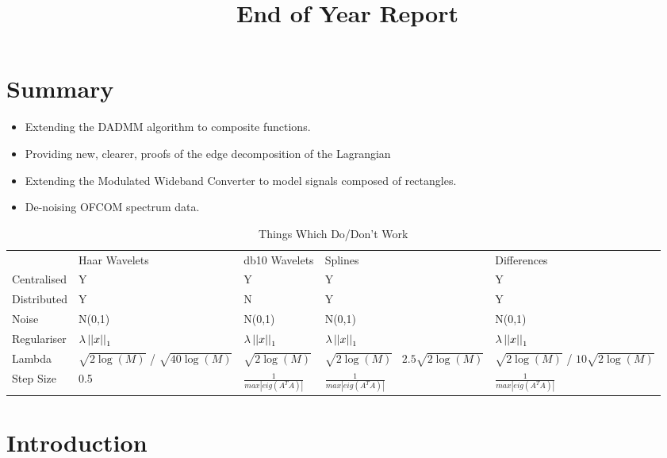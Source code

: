 \documentclass{article}
\title{End of Year Report}
\begin{document}
\maketitle

\tableofcontents

\section{Summary}

\begin{itemize}
\item Extending the DADMM algorithm to composite functions.
\item Providing new, clearer, proofs of the edge decomposition of the Lagrangian
\item Extending the Modulated Wideband Converter to model signals composed of rectangles.
\item De-noising OFCOM spectrum data.
\end{itemize}


\begin{table}[]
\centering
\caption{Things Which Do/Don't Work}
\label{my-label}
\begin{tabular}{lllll}
            & Haar Wavelets & db10 Wavelets & Splines & Differences \\
Centralised &          Y     &     Y          &     Y    &            Y \\
Distributed &     Y          &       N        &     Y    &            Y \\
Noise      &     N(0,1)          &     N(0,1)          &        N(0,1) &            N(0,1) \\
Regulariser & \(\lambda\left|\left|x\right|\right|_1\) & \(\lambda\left|\left|x\right|\right|_1\)  & \(\lambda\left|\left|x\right|\right|_1\) & \(\lambda\left|\left|x\right|\right|_1\) \\
Lambda & \(\sqrt{2\log(M)}\)  / \(\sqrt{40\log(M)}\) & \(\sqrt{2\log(M)}\) & \(\sqrt{2\log(M)}\) \ \(2.5\sqrt{2\log(M)}\)& \(\sqrt{2\log(M)}\) / \(10\sqrt{2\log(M)}\) \\
Step Size & 0.5 & \( \frac{1}{max|eig(A^TA)|} \) & \( \frac{1}{max|eig(A^TA)|} \) & \( \frac{1}{max|eig(A^TA)|} \)
\end{tabular}
\end{table}

\section{Introduction}
\end{document}
